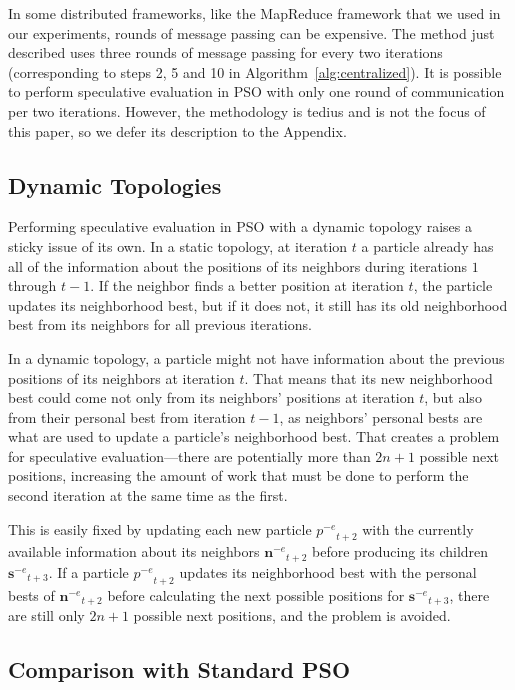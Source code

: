 \documentclass[journal,letterpaper]{IEEEtran}
\newcommand{\alg}[1]{Algorithm~\ref{alg:#1}}
\providecommand{\noeval}[1]{\ensuremath{#1^{-e}}}
\providecommand{\p}{\ensuremath{p}}
\providecommand{\sset}{\ensuremath{\mathbf{s}}}
\providecommand{\nset}{\ensuremath{\mathbf{n}}}
\begin{document}
In some distributed frameworks, like the MapReduce framework that we used in
our experiments, rounds of message passing can be expensive.  The method just
described uses three rounds of message passing for every two iterations
(corresponding to steps 2, 5 and 10 in \alg{centralized}).  It is possible to
perform speculative evaluation in PSO with only one round of communication per
two iterations.  However, the methodology is tedius and is not the focus of
this paper, so we defer its description to the Appendix.

\subsection{Dynamic Topologies}

Performing speculative evaluation in PSO with a dynamic topology raises a
sticky issue of its own.  In a static topology, at iteration $t$ a particle
already has all of the information about the positions of its neighbors during
iterations $1$ through $t-1$.  If the neighbor finds a better position at
iteration $t$, the particle updates its neighborhood best, but if it does not,
it still has its old neighborhood best from its neighbors for all previous
iterations.

In a dynamic topology, a particle might not have information about the previous
positions of its neighbors at iteration $t$.  That means that its new
neighborhood best could come not only from its neighbors' positions at
iteration $t$, but also from their personal best from iteration $t-1$, as
neighbors' personal bests are what are used to update a particle's neighborhood
best.  That creates a problem for speculative evaluation---there are
potentially more than $2n+1$ possible next positions, increasing the amount of
work that must be done to perform the second iteration at the same time as the
first.

This is easily fixed by updating each new particle $\noeval{\p}_{t+2}$ with the
currently available information about its neighbors $\noeval{\nset}_{t+2}$
before producing its children $\noeval{\sset}_{t+3}$.  If a particle
$\noeval{\p}_{t+2}$ updates its neighborhood best with the personal bests of
$\noeval{\nset}_{t+2}$ before calculating the next possible positions for
$\noeval{\sset}_{t+3}$, there are still only $2n+1$ possible next positions,
and the problem is avoided.

\subsection{Comparison with Standard PSO}
\label{sec:results}
\end{document}
